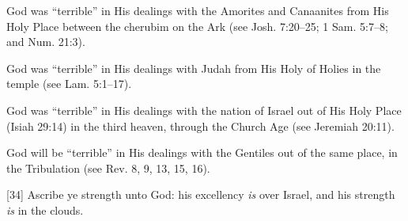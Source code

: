 {\begin{compactenum}
\item God was “terrible” in His dealings with the Amorites and Canaanites from His Holy Place between the cherubim on the Ark (see Josh. 7:20--25; 1 Sam. 5:7--8; and Num. 21:3).
\item God was “terrible” in His dealings with Judah from His Holy of Holies in the temple (see Lam. 5:1--17).
\item God was ``terrible'' in His dealings with the nation of Israel out of His Holy Place (Isiah 29:14) in the third heaven, through the Church Age (see Jeremiah 20:11).
\item God will be ``terrible'' in His dealings with the Gentiles out of the same place, in the Tribulation (see Rev. 8, 9, 13, 15, 16).
\end{compactenum} }
[34] \textcolor[rgb]{0.00,0.00,1.00}{Ascribe ye strength unto God: his excellency \emph{is} over Israel, and his strength \emph{is} in the clouds.}
